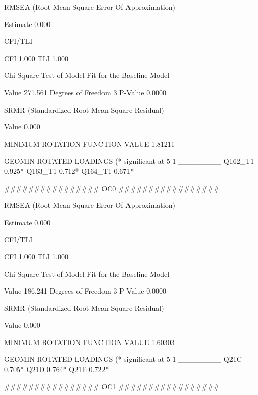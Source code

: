 RMSEA (Root Mean Square Error Of Approximation)

          Estimate                           0.000

CFI/TLI

          CFI                                1.000
          TLI                                1.000

Chi-Square Test of Model Fit for the Baseline Model

          Value                            271.561
          Degrees of Freedom                     3
          P-Value                           0.0000

SRMR (Standardized Root Mean Square Residual)

          Value                              0.000



MINIMUM ROTATION FUNCTION VALUE       1.81211



           GEOMIN ROTATED LOADINGS (* significant at 5%
                  1
              ________
 Q162_T1        0.925*
 Q163_T1        0.712*
 Q164_T1        0.671*


  ################
OC0
#################

RMSEA (Root Mean Square Error Of Approximation)

          Estimate                           0.000

CFI/TLI

          CFI                                1.000
          TLI                                1.000

Chi-Square Test of Model Fit for the Baseline Model

          Value                            186.241
          Degrees of Freedom                     3
          P-Value                           0.0000

SRMR (Standardized Root Mean Square Residual)

          Value                              0.000



MINIMUM ROTATION FUNCTION VALUE       1.60303



           GEOMIN ROTATED LOADINGS (* significant at 5%
                  1
              ________
 Q21C           0.705*
 Q21D           0.764*
 Q21E           0.722*


 
 ################
OC1
#################

